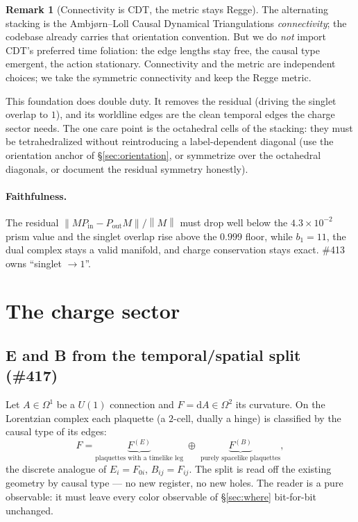 \documentclass[11pt]{article}
\theoremstyle{definition}
\newtheorem{remark}{Remark}
\newcommand{\norm}[1]{\left\lVert #1 \right\rVert}
\newcommand{\Pin}{P_{\mathrm{in}}}
\newcommand{\Pout}{P_{\mathrm{out}}}
\newcommand{\dd}{\mathrm{d}}
\begin{document}
\begin{remark}[Connectivity is CDT, the metric stays Regge]
\label{rem:cdt}
The alternating stacking is the Ambj\o rn--Loll Causal Dynamical Triangulations
\emph{connectivity}; the codebase already carries that orientation convention. But we do
\emph{not} import CDT's preferred time foliation: the edge lengths stay free, the causal
type emergent, the action stationary. Connectivity and the metric are independent
choices; we take the symmetric connectivity and keep the Regge metric.
\end{remark}

This foundation does double duty. It removes the residual (driving the singlet overlap to
$1$), and its worldline edges are the clean temporal edges the charge sector needs. The
one care point is the octahedral cells of the stacking: they must be tetrahedralized
without reintroducing a label-dependent diagonal (use the orientation anchor of
\S\ref{sec:orientation}, or symmetrize over the octahedral diagonals, or document the
residual symmetry honestly).

\paragraph{Faithfulness.} The residual
$\norm{M\Pin-\Pout M}/\norm{M}$ must drop well below the $4.3\times10^{-2}$ prism value
and the singlet overlap rise above the $0.999$ floor, while $b_1=11$, the dual complex
stays a valid manifold, and charge conservation stays exact. \#413 owns ``singlet
$\to1$''.

\section{The charge sector}
\label{sec:charge}

\subsection{E and B from the temporal/spatial split (\#417)}
\label{sec:eb}

Let $A\in\Omega^1$ be a $U(1)$ connection and $F=\dd A\in\Omega^2$ its curvature. On the
Lorentzian complex each plaquette (a $2$-cell, dually a hinge) is classified by the
causal type of its edges:
\begin{equation}
  F = \underbrace{F^{(E)}}_{\text{plaquettes with a timelike leg}}
      \;\oplus\;
      \underbrace{F^{(B)}}_{\text{purely spacelike plaquettes}} ,
\end{equation}
the discrete analogue of $E_i=F_{0i}$, $B_{ij}=F_{ij}$. The split is read off the
existing geometry by causal type --- no new register, no new holes. The reader is a pure
observable: it must leave every color observable of \S\ref{sec:where} bit-for-bit
unchanged.
\end{document}
